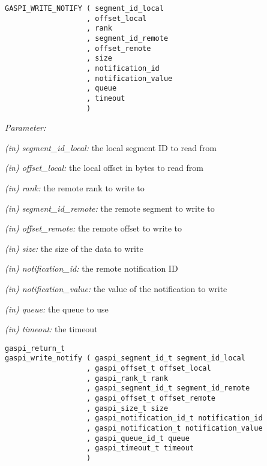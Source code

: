 \documentclass[a4paper]{article}
\newlength{\st}\setlength{\st}{0pt}
\newcommand{\parameter}[1]{{\it #1}}
\newenvironment{cbox}[1]
{\newcommand\colboxcolor{#1}\begin{lrbox}{\riddlebox}\begin{minipage}{\dimexpr\columnwidth-2\fboxsep\relax}}
{\end{minipage}\end{lrbox}\begin{center}\colorbox[HTML]{\colboxcolor}{\usebox{\riddlebox}}\end{center}}
\newcommand{\shortlistbegin}[1]{\begin{trivlist}\setlength{\itemsep}{0pt}\item[]\emph{#1:}}
\newcommand{\shortlistitem}[1]{\item[]#1}
\newcommand{\shortlistend}{\end{trivlist}}
\newenvironment{FDef}{\begin{trivlist}\item[]}{\end{trivlist}}
\newenvironment{FDefSign}{\begin{cbox}{EEEEEE}}{\end{cbox}}
\newcommand{\parameterlistbegin}{\shortlistbegin{Parameter}}
\newcommand{\parameterlistend}{\shortlistend}
\newcommand{\parameterlistitem}[3]{\shortlistitem{\parameter{(#1) #2:} {#3}}}
\begin{document}
\begin{FDef}

\begin{FDefSign}
\begin{verbatim}
GASPI_WRITE_NOTIFY ( segment_id_local
                   , offset_local
                   , rank
                   , segment_id_remote
                   , offset_remote
                   , size
                   , notification_id
                   , notification_value
                   , queue
                   , timeout
                   )
\end{verbatim}
\end{FDefSign}

\parameterlistbegin
\parameterlistitem{in}{segment\_id\_local}{the local segment ID to read from}
\parameterlistitem{in}{offset\_local}{the local offset in bytes to read from}
\parameterlistitem{in}{rank}{the remote rank to write to}
\parameterlistitem{in}{segment\_id\_remote}{the remote segment to write to}
\parameterlistitem{in}{offset\_remote}{the remote offset to write to}
\parameterlistitem{in}{size}{the size of the data to write}
\parameterlistitem{in}{notification\_id}{the remote notification ID}
\parameterlistitem{in}{notification\_value}{the value of the notification to write}
\parameterlistitem{in}{queue}{the queue to use}
\parameterlistitem{in}{timeout}{the timeout}
\parameterlistend


\begin{FDefSign}
\begin{verbatim}
gaspi_return_t
gaspi_write_notify ( gaspi_segment_id_t segment_id_local
                   , gaspi_offset_t offset_local
                   , gaspi_rank_t rank
                   , gaspi_segment_id_t segment_id_remote
                   , gaspi_offset_t offset_remote
                   , gaspi_size_t size
                   , gaspi_notification_id_t notification_id
                   , gaspi_notification_t notification_value
                   , gaspi_queue_id_t queue
                   , gaspi_timeout_t timeout
                   )
\end{verbatim}
\end{FDefSign}



\end{FDef}
\end{document}
